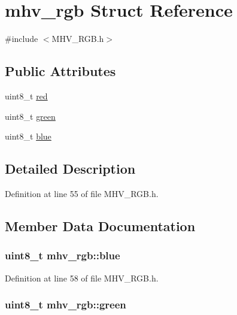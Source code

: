 \hypertarget{structmhv__rgb}{\section{mhv\-\_\-rgb Struct Reference}
\label{structmhv__rgb}
}


{\ttfamily \#include $<$M\-H\-V\-\_\-\-R\-G\-B.\-h$>$}

\subsection*{Public Attributes}
\begin{DoxyCompactItemize}
\item 
uint8\-\_\-t \hyperlink{structmhv__rgb_a0f10bc24930951dba3e243614179d493}{red}
\item 
uint8\-\_\-t \hyperlink{structmhv__rgb_a8104f3c7b5b2f2bf61e5d92322cb9ec3}{green}
\item 
uint8\-\_\-t \hyperlink{structmhv__rgb_a14e5b7c703ea5890d99fcc43d9448561}{blue}
\end{DoxyCompactItemize}


\subsection{Detailed Description}


Definition at line 55 of file M\-H\-V\-\_\-\-R\-G\-B.\-h.



\subsection{Member Data Documentation}
\hypertarget{structmhv__rgb_a14e5b7c703ea5890d99fcc43d9448561}{
\subsubsection[{blue}]{\setlength{\rightskip}{0pt plus 5cm}uint8\-\_\-t mhv\-\_\-rgb\-::blue}}\label{structmhv__rgb_a14e5b7c703ea5890d99fcc43d9448561}


Definition at line 58 of file M\-H\-V\-\_\-\-R\-G\-B.\-h.

\hypertarget{structmhv__rgb_a8104f3c7b5b2f2bf61e5d92322cb9ec3}{
\subsubsection[{green}]{\setlength{\rightskip}{0pt plus 5cm}uint8\-\_\-t mhv\-\_\-rgb\-::green}}\label{structmhv__rgb_a8104f3c7b5b2f2bf61e5d92322cb9ec3}


